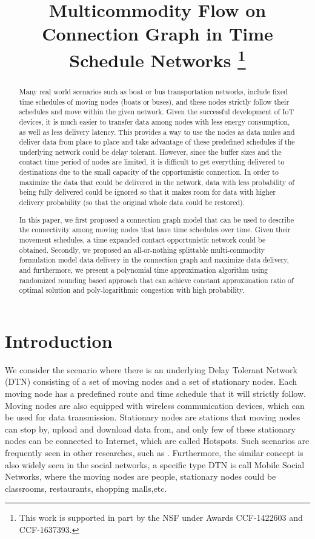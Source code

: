 \documentclass[conference]{IEEEtran}
\title{Multicommodity Flow on Connection Graph in Time Schedule Networks
\thanks{This work is supported in part by the NSF under Awards CCF-1422603 and CCF-1637393.}}
\begin{document}
\maketitle

\begin{abstract}
	
Many real world scenarios such as boat or bus transportation networks, include fixed time schedules of moving nodes (boats or buses), and these nodes strictly follow their schedules and move within the given network. Given the successful development of IoT devices, it is much easier to transfer data among nodes with less energy consumption, as well as less delivery latency. This provides a way to use the nodes as data mules and deliver data from place to place and take advantage of these predefined schedules if the underlying network could be delay tolerant. However, since the buffer sizes and the contact time period of nodes are limited, it is difficult to get everything delivered to destinations due to the small capacity of the opportunistic connection. In order to maximize the data that could be delivered in the network, 
data with less probability of being fully delivered could be ignored so that it makes room for data with higher delivery probability (so that the original whole data could be restored). 

In this paper, we first proposed a connection graph model that can be used to describe the connectivity among moving nodes that have time schedules over time. Given their movement schedules, a time expanded contact opportunistic network could be obtained. Secondly, we proposed an all-or-nothing splittable multi-commodity formulation model data delivery in the connection graph and maximize data delivery, and furthermore, we present a polynomial time approximation algorithm using randomized rounding based approach that can achieve  constant approximation ratio of optimal solution and poly-logarithmic congestion with high probability.

\end{abstract}


\section{Introduction}
We consider the scenario where there is an underlying Delay Tolerant Network (DTN) consisting of a set of moving nodes and a set of stationary nodes. Each moving node has a predefined route and time schedule that it will strictly follow. Moving nodes are also equipped with wireless communication devices, which can be used for data transmission. Stationary nodes are  stations that moving nodes can stop by, upload and download data from, and only few of these stationary nodes can be connected to Internet, which are called Hotspots. Such scenarios are frequently seen in other researches, such as \cite{BurgessGJL06,AcerGHNT12,LiuJAERC15}. Furthermore, the similar concept is also widely seen in the social networks, a specific type DTN is call Mobile Social Networks, where the moving nodes are people, stationary nodes could be classrooms, restaurants, shopping malls,etc. 
\end{document}
